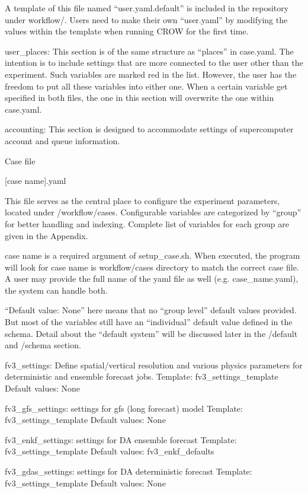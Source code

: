 A template of this file named “user.\-yaml.\-default” is included in the repository under workflow/. Users need to make their own “user.\-yaml” by modifying the values within the template when running C\-R\-O\-W for the first time.

user\-\_\-places\-: This section is of the same structure as “places” in case.\-yaml. The intention is to include settings that are more connected to the user other than the experiment. Such variables are marked red in the list. However, the user has the freedom to put all these variables into either one. When a certain variable get specified in both files, the one in this section will overwrite the one within case.\-yaml.

accounting\-: This section is designed to accommodate settings of supercomputer account and queue information.

Case file

\mbox{[}case name\mbox{]}.yaml

This file serves as the central place to configure the experiment parameters, located under /workflow/cases. Configurable variables are categorized by “group” for better handling and indexing. Complete list of variables for each group are given in the Appendix.

case name is a required argument of setup\-\_\-case.\-sh. When executed, the program will look for case name is workflow/cases directory to match the correct case file. A user may provide the full name of the yaml file as well (e.\-g. case\-\_\-name.\-yaml), the system can handle both.

“\-Default value\-: None” here means that no “group level” default values provided. But most of the variables still have an “individual” default value defined in the schema. Detail about the “default system” will be discussed later in the /default and /schema section.

fv3\-\_\-settings\-: Define spatial/vertical resolution and various physics parameters for deterministic and ensemble forecast jobs. Template\-: fv3\-\_\-settings\-\_\-template Default values\-: None

fv3\-\_\-gfs\-\_\-settings\-: settings for gfs (long forecast) model Template\-: fv3\-\_\-settings\-\_\-template Default values\-: None

fv3\-\_\-enkf\-\_\-settings\-: settings for D\-A ensemble forecast Template\-: fv3\-\_\-settings\-\_\-template Default values\-: fv3\-\_\-enkf\-\_\-defaults

fv3\-\_\-gdas\-\_\-settings\-: settings for D\-A deterministic forecast Template\-: fv3\-\_\-settings\-\_\-template Default values\-: None


